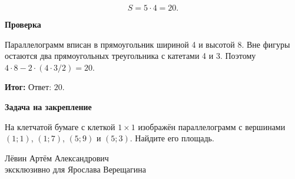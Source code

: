 \documentclass[a4paper,12pt]{article}
\newcommand{\signature}{Лёвин Артём Александрович\\эксклюзивно для Ярослава Верещагина}
\newcommand{\sub}[1]{\par\smallskip\textcolor{darkaccent}{\textbf{#1}}\par}
\newcommand{\result}[1]{\par\textcolor{darkaccent}{\textbf{Итог:}} #1\par}
\newcommand{\practice}[1]{\par\medskip{\color{accent}\hrule}\smallskip\textcolor{darkaccent}{\textbf{Задача на закрепление}}\par #1}
\begin{document}
\[
S=5\cdot4=20.
\]
\sub{Проверка}
Параллелограмм вписан в прямоугольник шириной 4 и высотой 8. Вне фигуры остаются два прямоугольных треугольника с катетами 4 и 3. Поэтому $4\cdot8-2\cdot(4\cdot3/2)=20$.
\result{Ответ: $20$.}
\practice{На клетчатой бумаге с клеткой $1\times1$ изображён параллелограмм с вершинами $(1;1)$, $(1;7)$, $(5;9)$ и $(5;3)$. Найдите его площадь.}
\vfill
\begin{center}\small\signature\end{center}
\end{document}
